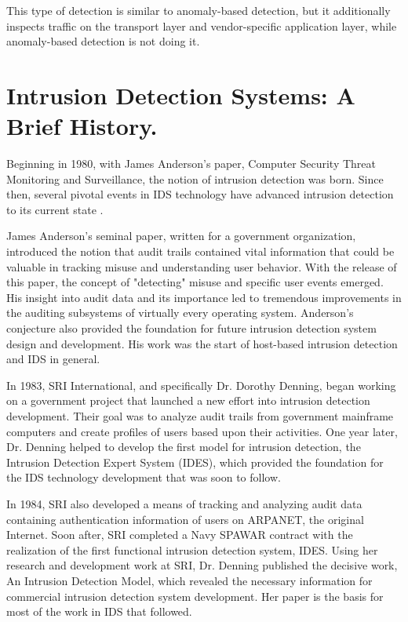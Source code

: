 \documentclass[thesis=M,english]{FITthesis}[2011/07/15]
\begin{document}
This type of detection is similar to anomaly-based detection, but it additionally inspects traffic on the transport layer and vendor-specific application layer, while anomaly-based detection is not doing it.

\section{Intrusion Detection Systems: A Brief History.}
Beginning in 1980, with James Anderson's paper, Computer Security Threat Monitoring and Surveillance, the notion of intrusion detection was born. Since then, several pivotal events in IDS technology have advanced intrusion detection to its current state \cite{nids_evolution}.

James Anderson's seminal paper, written for a government organization, introduced the notion that audit trails contained vital information that could be valuable in tracking misuse and understanding user behavior. With the release of this paper, the concept of "detecting" misuse and specific user events emerged. His insight into audit data and its importance led to tremendous improvements in the auditing subsystems of virtually every operating system. Anderson's conjecture also provided the foundation for future intrusion detection system design and development. His work was the start of host-based intrusion detection and IDS in general.

In 1983, SRI International, and specifically Dr. Dorothy Denning, began working on a government project that launched a new effort into intrusion detection development. Their goal was to analyze audit trails from government mainframe computers and create profiles of users based upon their activities. One year later, Dr. Denning helped to develop the first model for intrusion detection, the Intrusion Detection Expert System (IDES), which provided the foundation for the IDS technology development that was soon to follow.

In 1984, SRI also developed a means of tracking and analyzing audit data containing authentication information of users on ARPANET, the original Internet. Soon after, SRI completed a Navy SPAWAR contract with the realization of the first functional intrusion detection system, IDES. Using her research and development work at SRI, Dr. Denning published the decisive work, An Intrusion Detection Model, which revealed the necessary information for commercial intrusion detection system development. Her paper is the basis for most of the work in IDS that followed.
\end{document}
